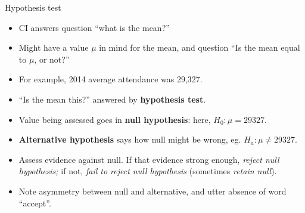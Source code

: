 \documentclass[
  ignorenonframetext,
]{beamer}
\providecommand{\tightlist}{%
  \setlength{\itemsep}{0pt}\setlength{\parskip}{0pt}}
\begin{document}
\begin{frame}{Hypothesis test}
\protect\hypertarget{hypothesis-test}{}

\begin{itemize}
\tightlist
\item
  CI answers question ``what is the mean?''
\item
  Might have a value \(\mu\) in mind for the mean, and question ``Is the
  mean equal to \(\mu\), or not?''
\item
  For example, 2014 average attendance was 29,327.
\item
  ``Is the mean this?'' answered by \textbf{hypothesis test}.
\item
  Value being assessed goes in \textbf{null hypothesis}: here,
  \(H_0 : \mu = 29327\).
\item
  \textbf{Alternative hypothesis} says how null might be wrong, eg.
  \(H_a : \mu \ne 29327\).
\item
  Assess evidence against null. If that evidence strong enough,
  \emph{reject null hypothesis;} if not, \emph{fail to reject null
  hypothesis} (sometimes \emph{retain null}).
\item
  Note asymmetry between null and alternative, and utter absence of word
  ``accept''.
\end{itemize}

\end{frame}
\end{document}
